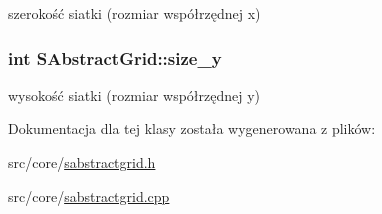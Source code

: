 szerokość siatki (rozmiar współrzędnej x) \hypertarget{classSAbstractGrid_b9fddbe2004e7242dff69aa20da8a3c3}{
\subsubsection[{size\_\-y}]{\setlength{\rightskip}{0pt plus 5cm}int {\bf SAbstractGrid::size\_\-y}}}
\label{classSAbstractGrid_b9fddbe2004e7242dff69aa20da8a3c3}


wysokość siatki (rozmiar współrzędnej y) 

Dokumentacja dla tej klasy została wygenerowana z plików:\begin{CompactItemize}
\item 
src/core/\hyperlink{sabstractgrid_8h}{sabstractgrid.h}\item 
src/core/\hyperlink{sabstractgrid_8cpp}{sabstractgrid.cpp}\end{CompactItemize}
